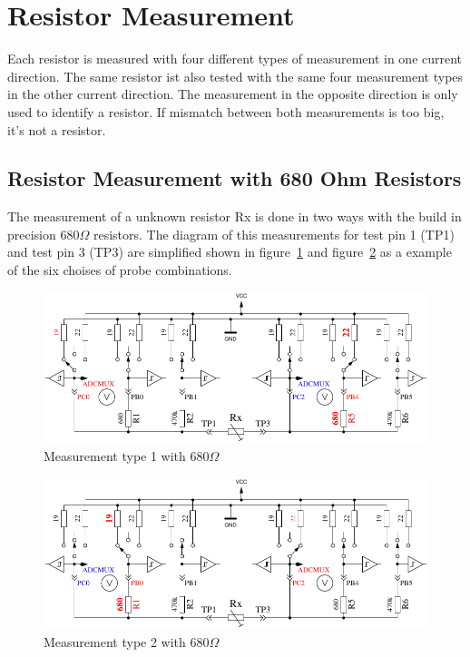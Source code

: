 \section{Resistor Measurement}
Each resistor is measured with four different types of measurement in one current direction.
The same resistor ist also tested with the same four measurement types in the other current direction.
The measurement in the opposite direction is only used to identify a resistor.
If mismatch between both measurements is too big, it's not a resistor.

\subsection{Resistor Measurement with 680 Ohm Resistors}
The measurement of a unknown resistor Rx is done in two ways with the build in precision
 \(680\Omega\) resistors. The diagram of this measurements for test pin 1 (TP1) and test pin 3 (TP3) are
 simplified shown in figure~\ref{fig:RL1mes} and figure~\ref{fig:RL2mes} as a example of the six choises of probe combinations.

\begin{figure}[H]
\centering
\includegraphics[width=.8\textwidth]{../FIG/ResistormessL1.pdf}
\caption{Measurement type 1 with \(680\Omega\) }
\label{fig:RL1mes}
\end{figure}

\begin{figure}[H]
 \centering
 \includegraphics[width=.8\textwidth]{../FIG/ResistormessL2.pdf}
 \caption{Measurement type 2 with \(680\Omega\) }
\label{fig:RL2mes}
\end{figure}

